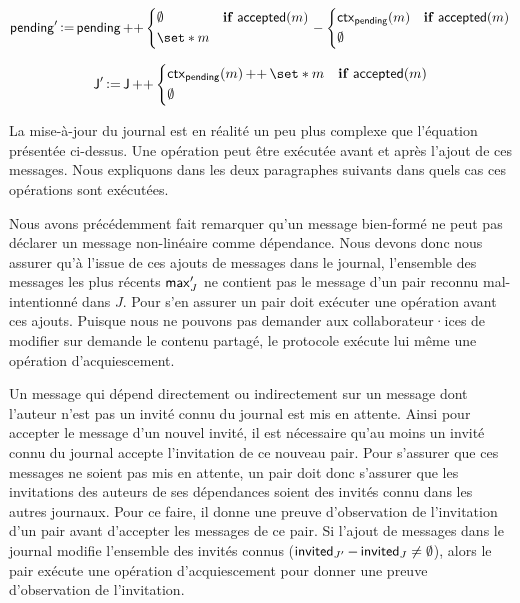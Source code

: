 \begin{equation*}
    \trm{pending}' \assign \trm{pending} \lappend \begin{dcases}
        \emptyset & \when \trm{accepted}(m)\\
        \set*{m}
    \end{dcases} \sminus \begin{dcases}
        \trm{ctx}_{\trm{pending}}(m) & \when \trm{accepted}(m)\\
        \emptyset
    \end{dcases}
\end{equation*}

\begin{equation*}
    \trm{J}' \assign \trm{J} \lappend \begin{dcases}
        \trm{ctx}_{\trm{pending}}(m) \lappend \set*{m} & \when \trm{accepted}(m)\\
        \emptyset
    \end{dcases}
\end{equation*}

La mise-à-jour du journal est en réalité un peu plus complexe que l'équation présentée ci-dessus.
Une opération peut être exécutée avant et après l'ajout de ces messages.
Nous expliquons dans les deux paragraphes suivants dans quels cas ces opérations sont exécutées.

Nous avons précédemment fait remarquer qu'un message bien-formé ne peut pas déclarer un message non-linéaire comme dépendance.
Nous devons donc nous assurer qu'à l'issue de ces ajouts de messages dans le journal, l'ensemble des messages les plus récents $\operatorname{\mathsf{max}}_J'$ ne contient pas le message d'un pair reconnu mal-intentionné dans $J$.
Pour s'en assurer un pair doit exécuter une opération avant ces ajouts.
Puisque nous ne pouvons pas demander aux collaborateur·ices de modifier sur demande le contenu partagé, le protocole exécute lui même une opération d'acquiescement.


Un message qui dépend directement ou indirectement sur un message dont l'auteur n'est pas un invité connu du journal est mis en attente.
Ainsi pour accepter le message d'un nouvel invité, il est nécessaire qu'au moins un invité connu du journal accepte l'invitation de ce nouveau pair.
Pour s'assurer que ces messages ne soient pas mis en attente, un pair doit donc s'assurer que les invitations des auteurs de ses dépendances soient des invités connu dans les autres journaux.
Pour ce faire, il donne une preuve d'observation de l'invitation d'un pair avant d'accepter les messages de ce pair.
Si l'ajout de messages dans le journal modifie l'ensemble des invités connus ($\operatorname{\mathsf{invited}}_{J'} - \operatorname{\mathsf{invited}}_J \neq \emptyset$), alors le pair exécute une opération d'acquiescement pour donner une preuve d'observation de l'invitation.


